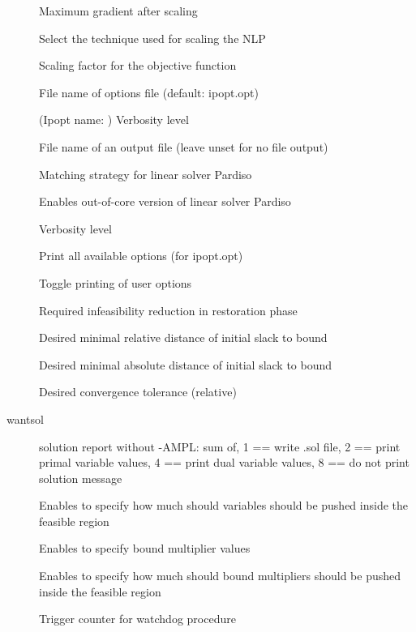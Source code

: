 \begin{description}
\item[{}] Maximum gradient after scaling
\item[{}] Select the technique used for scaling the NLP
\item[{}] Scaling factor for the objective function
\item[{}] File name of options file (default: ipopt.opt)
\item[{}] (Ipopt name: ) Verbosity level
\item[{}] File name of an output file (leave unset for no file output)
\item[{}] Matching strategy for linear solver Pardiso
\item[{}] Enables out-of-core version of linear solver Pardiso
\item[{}] Verbosity level
\item[{}] Print all available options (for ipopt.opt)
\item[{}] Toggle printing of user options
\item[{}] Required infeasibility reduction in restoration phase
\item[{}] Desired minimal relative distance of initial slack to bound
\item[{}] Desired minimal absolute distance of initial slack to bound
\item[{}] Desired convergence tolerance (relative)
\item[wantsol] solution report without -AMPL: sum of, 		1 == write .sol file, 		2 == print primal variable values, 		4 == print dual variable values, 		8 == do not print solution message
\item[{}] Enables to specify how much should variables should be pushed inside the feasible region
\item[{}] Enables to specify bound multiplier values
\item[{}] Enables to specify how much should bound multipliers should be pushed inside the feasible region
\item[{}] Trigger counter for watchdog procedure
\end{description}
